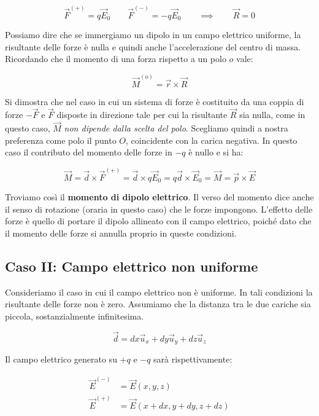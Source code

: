 \[
	\vec{F}^{(+)} = q\vec{E}_0 \qquad \vec{F}^{(-)} = -q\vec{E}_0 \qquad \implies \qquad \boxed{\vec{R} = 0}
\]

Possiamo dire che se immergiamo un dipolo in un campo elettrico uniforme, la risultante delle forze è nulla e quindi anche l'accelerazione del centro di massa. Ricordando che il momento di una forza rispetto a un polo $ o $ vale:

\[
	\vec{M}^{(o)} = \vec{r} \times \vec{R}
\]

Si dimostra che nel caso in cui un sistema di forze è costituito da una coppia di forze $-\vec{F}$ e $\vec{F}$ disposte in direzione tale per cui la risultante $\vec{R}$ sia nulla, come in questo caso, $\vec{M}$ \emph{non dipende dalla scelta del polo}. Scegliamo quindi a nostra preferenza come polo il punto $O$, coincidente con la carica negativa. In questo caso il contributo del momento delle forze in $-q$ è nullo e si ha:

\[
	\vec{M} =\vec{d} \times \vec{F}^{(+)} = \vec{d} \times q\vec{E}_0 = q\vec{d} \times \vec{E}_0 = \boxed{\vec{M} = \vec{p} \times \vec{E}}
\]

Troviamo così il \textbf{momento di dipolo elettrico}. Il verso del momento dice anche il senso di rotazione (oraria in questo caso) che le forze impongono. L'effetto delle forze è quello di portare il dipolo allineato con il campo elettrico, poiché dato che il momento delle forze si annulla proprio in queste condizioni.

\subsection{Caso II: Campo elettrico non uniforme}

Consideriamo il caso in cui il campo elettrico non è uniforme.
In tali condizioni la risultante delle forze non è zero. Assumiamo che la distanza tra le due cariche sia piccola, sostanzialmente infinitesima.

\[
	\vec{d} =dx\vec{u}_x + dy\vec{u}_y+dz\vec{u}_z
\]

Il campo elettrico generato su $+q$ e $-q$ sarà rispettivamente:

\begin{align*}
	\vec{E}^{(-)} &= \vec{E} (x,y,z) \\
	\vec{E}^{(+)} &= \vec{E} (x+dx,y+dy,z+dz)
\end{align*}

